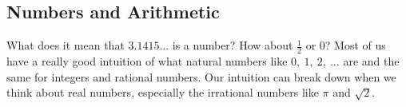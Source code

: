 \documentclass[oneside]{book}
\begin{document}
\begin{spacing}{1.618}
\appendix
\chapter{Numbers and Arithmetic}\label{appendix:numbers_and_arithmetic}

What does it mean that $3.1415...$ is a number? How about $\frac{1}{2}$ or $0$? Most of us have a really good intuition of what natural numbers like $0,~1,~2,~\dots$ are and the same for integers and rational numbers. Our intuition can break down when we think about real numbers, especially the irrational numbers like $\pi$ and $\sqrt{2}$. 

\end{spacing}
\backmatter




\printindex
\end{document}
